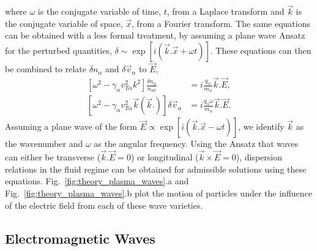 where $\omega$ is the conjugate variable of time, $t$, from a Laplace transform and $\vec{k}$ is the conjugate variable of space, $\vec{x}$, from a Fourier transform.
The same equations can be obtained with a less formal treatment, by assuming a plane wave Ansatz for the perturbed quantities, $\delta\sim\exp{[i(\vec{k}.\vec{x} + \omega t)]}$.
These equations can then be combined to relate $\delta n_\alpha$ and $\delta \vec{v}_\alpha$ to $\vec{E}$,
\begin{align}
    \label{eq:theory_wave2s_1}
    \left[ \omega^2 - \gamma_\alpha v_{T\alpha}^2 k^2 \right]\frac{\delta n_\alpha}{n_{\alpha 0}} &= i \frac{q_\alpha}{m_\alpha} \vec{k}.\vec{E},\\
    \label{eq:theory_wave2s_2}
    \left[ \omega^2 - \gamma_\alpha v_{T\alpha}^2 \vec{k}(\vec{k}.) \right]\delta \vec{v}_\alpha &= i \frac{q_\alpha \omega}{m_\alpha} \vec{k}.\vec{E}.
\end{align}
Assuming a plane wave of the form $\vec{E}\propto \exp{\left[ i\left( \vec{k}.\vec{x} - \omega t \right) \right]}$, we identify $\vec{k}$ as the wavenumber and $\omega$ as the angular frequency.
Using the Ansatz that waves can either be transverse ($\vec{k}.\vec{E}=0$) or longitudinal ($\vec{k}\times\vec{E}=0$), dispersion relations in the fluid regime can be obtained for admissible solutions using these equations.
Fig.~\ref{fig:theory_plasma_waves}.a and Fig.~\ref{fig:theory_plasma_waves}.b plot the motion of particles under the influence of the electric field from each of these wave varieties.

\subsection{Electromagnetic Waves}%
\label{sec:theory_transwaves}

